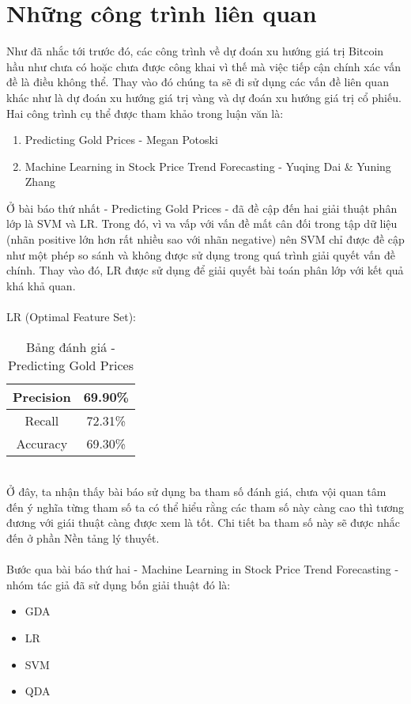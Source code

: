 \chapter{Những công trình liên quan}
Như đã nhắc tới trước đó, các công trình về dự đoán xu hướng giá trị Bitcoin 
hầu như chưa có hoặc chưa được công khai vì thế mà việc tiếp cận chính xác vấn 
đề là điều không thể. Thay vào đó chúng ta sẽ đi sử dụng các vấn đề liên quan 
khác như là dự đoán xu hướng giá trị vàng và dự đoán xu hướng giá trị cổ phiếu.
Hai công trình cụ thể được tham khảo trong luận văn là:
\begin{enumerate}
\item Predicting Gold Prices - Megan Potoski \cite{PredictingGoldPrices}
\item Machine Learning in Stock Price Trend Forecasting - Yuqing Dai \& 
Yuning Zhang \cite{StockPriceTrendForecasting} 
\end{enumerate}
Ở bài báo thứ nhất - Predicting Gold Prices - đã đề cập đến hai giải thuật phân lớp 
là SVM và LR. Trong đó, vì va vấp với vấn đề mất cân đối trong tập 
dữ liệu (nhãn positive lớn hơn rất nhiều sao với nhãn negative) nên SVM chỉ được 
đề cập như một phép so sánh và không được sử dụng trong quá trình giải quyết vấn 
đề chính. Thay vào đó, LR được sử dụng để giải quyết bài toán 
phân lớp với kết quả khá khả quan.\\\\
LR (Optimal Feature Set):
\begin{table}[h]
\centering
\begin{tabular}{ |c|c| }
\hline
Precision & 69.90\% \\
\hline
Recall & 72.31\% \\
\hline
Accuracy & 69.30\% \\
\hline
\end{tabular}
\caption{Bảng đánh giá - Predicting Gold Prices}
\end{table}\\
Ở đây, ta nhận thấy bài báo sử dụng ba tham số đánh giá, chưa vội quan tâm đến 
ý nghĩa từng tham số ta có thể hiểu rằng các tham số này càng cao thì tương 
đương với giái thuật càng được xem là tốt. Chi tiết ba tham số này sẽ được nhắc 
đến ở phần Nền tảng lý thuyết.\\\\
Bước qua bài báo thứ hai - Machine Learning in Stock Price Trend Forecasting - 
nhóm tác giả đã sử dụng bốn giải thuật đó là:
\begin{itemize}
\item GDA
\item LR
\item SVM 
\item QDA
\end{itemize}
